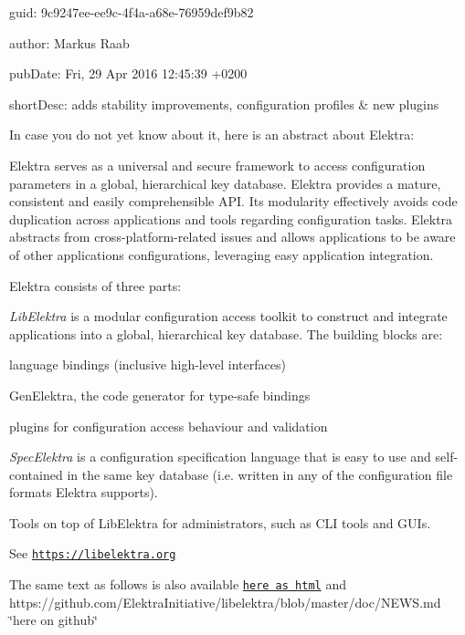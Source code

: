 
\begin{DoxyItemize}
\item guid\+: 9c9247ee-\/ee9c-\/4f4a-\/a68e-\/76959def9b82
\item author\+: Markus Raab
\item pub\+Date\+: Fri, 29 Apr 2016 12\+:45\+:39 +0200
\item short\+Desc\+: adds stability improvements, configuration profiles \& new plugins
\end{DoxyItemize}

In case you do not yet know about it, here is an abstract about Elektra\+:

Elektra serves as a universal and secure framework to access configuration parameters in a global, hierarchical key database. Elektra provides a mature, consistent and easily comprehensible A\+PI. Its modularity effectively avoids code duplication across applications and tools regarding configuration tasks. Elektra abstracts from cross-\/platform-\/related issues and allows applications to be aware of other applications\textquotesingle{} configurations, leveraging easy application integration.

Elektra consists of three parts\+:


\begin{DoxyEnumerate}
\item {\itshape Lib\+Elektra} is a modular configuration access toolkit to construct and integrate applications into a global, hierarchical key database. The building blocks are\+:
\begin{DoxyItemize}
\item language bindings (inclusive high-\/level interfaces)
\item Gen\+Elektra, the code generator for type-\/safe bindings
\item plugins for configuration access behaviour and validation
\end{DoxyItemize}
\item {\itshape Spec\+Elektra} is a configuration specification language that is easy to use and self-\/contained in the same key database (i.\+e. written in any of the configuration file formats Elektra supports).
\item Tools on top of Lib\+Elektra for administrators, such as C\+LI tools and G\+U\+Is.
\end{DoxyEnumerate}

See \href{https://libelektra.org}{\tt https\+://libelektra.\+org}

The same text as follows is also available \href{https://doc.libelektra.org/news/9c9247ee-ee9c-4f4a-a68e-76959def9b82.html}{\tt here as html} and https\+://github.com/\+Elektra\+Initiative/libelektra/blob/master/doc/\+N\+E\+W\+S.\+md \char`\"{}here on github\char`\"{}

